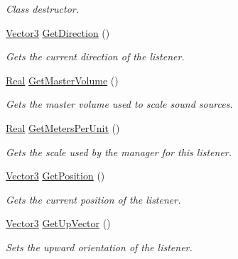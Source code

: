 \begin{DoxyCompactItemize}
\begin{DoxyCompactList}\small\item\em Class destructor. \item\end{DoxyCompactList}\item 
\hyperlink{classMezzanine_1_1Vector3}{Vector3} \hyperlink{classMezzanine_1_1Audio_1_1Listener_a62979c5c6eb31f2c98b5c8d56cece662}{GetDirection} ()
\begin{DoxyCompactList}\small\item\em Gets the current direction of the listener. \item\end{DoxyCompactList}\item 
\hyperlink{namespaceMezzanine_a726731b1a7df72bf3583e4a97282c6f6}{Real} \hyperlink{classMezzanine_1_1Audio_1_1Listener_a9eab36fdf62509af37a4b7cb7286e302}{GetMasterVolume} ()
\begin{DoxyCompactList}\small\item\em Gets the master volume used to scale sound sources. \item\end{DoxyCompactList}\item 
\hyperlink{namespaceMezzanine_a726731b1a7df72bf3583e4a97282c6f6}{Real} \hyperlink{classMezzanine_1_1Audio_1_1Listener_ad566d30003eb6e0b5e2bc86eed63636b}{GetMetersPerUnit} ()
\begin{DoxyCompactList}\small\item\em Gets the scale used by the manager for this listener. \item\end{DoxyCompactList}\item 
\hyperlink{classMezzanine_1_1Vector3}{Vector3} \hyperlink{classMezzanine_1_1Audio_1_1Listener_ac1a707dd38254dc1d84b82350ac37127}{GetPosition} ()
\begin{DoxyCompactList}\small\item\em Gets the current position of the listener. \item\end{DoxyCompactList}\item 
\hyperlink{classMezzanine_1_1Vector3}{Vector3} \hyperlink{classMezzanine_1_1Audio_1_1Listener_a715f525d05b60b01850e8d46f26640a4}{GetUpVector} ()
\begin{DoxyCompactList}\small\item\em Sets the upward orientation of the listener. \item\end{DoxyCompactList}\item 

\end{DoxyCompactItemize}
